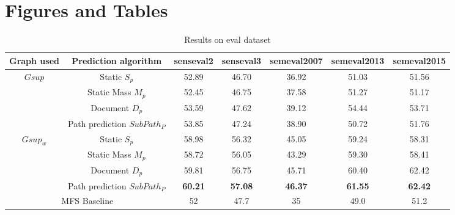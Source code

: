 \documentclass[0pt]{article}
\begin{document}
\newpage
\section{Figures and Tables}
\FloatBarrier
\begin{table}[!ht]
	\centering
	\caption{Results on eval dataset}
	\label{res}
	\begin{tabular}{|c|c||c|c|c|c|c|}
		\hline
		Graph used    & Prediction algorithm  &senseval2 & senseval3& semeval2007&semeval2013& semeval2015		\\ \hline \hline
		\multicolumn{1}{|c|}{\multirow{4}{*}{$Gsup$}} 
		 & Static    $S_{p}$   &   52.89   &        46.70  &  36.92 & 51.03 & 51.56    \\ \cline{2-7}  
		& Static Mass  $M_{p}$ &   52.45   & 46.75& 37.58& 51.27 &51.17 \\ \cline{2-7}  
		& Document       $D_{p}$  &   53.59   & 47.62& 39.12& 54.44& 53.71     \\ \cline{2-7}  
		& Path prediction $SubPath_{P}$  & 53.85& 47.24& 38.90 & 50.72 & 51.76 \\ \hline\hline
		\multicolumn{1}{|c|}{\multirow{4}{*}{\textbf{$Gsup_{w}$}}}
		 & Static   $S_{p}$   & 58.98 & 56.32 & 45.05& 59.24& 58.31 \\ \cline{2-7} 
		& Static Mass $M_{p}$ &  58.72      &56.05&43.29&59.30&58.41        \\ \cline{2-7} 
		& Document    $D_{p}$ &59.81 &56.75&45.71&60.40&62.42       \\ \cline{2-7} 
		& Path prediction $SubPath_{P}$  &\textbf{60.21}&\textbf{57.08} &\textbf{46.37} &\textbf{61.55}& \textbf{62.42} \\ \hline
		\hline
		\multicolumn{2}{|c|}{\multirow{1}{*}{MFS Baseline}}
		 & 52   &   47.7   & 35  & 49.0 & 51.2    \\ \hline
	\end{tabular}
\end{table}
\end{document}
